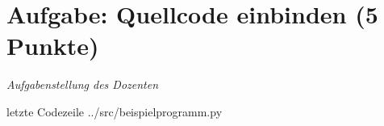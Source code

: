 
\newcommand{\dozent}{Prof. Dr. Claudia Müller-Birn, Barry Linnert}					%
\newcommand{\tutor}{Thierry Meurers}						%
\newcommand{\tutoriumNo}{10}				%
\newcommand{\ubungNo}{01}									%
\newcommand{\veranstaltung}{Objektorientierte Programmierung}	%
\newcommand{\semester}{SoSo 17}						%
\newcommand{\studenten}{Stefaan Hessmann, Jaap Pedersen, Mark Niehues}			%




\section{Aufgabe: Quellcode einbinden \hfill (5 Punkte)}
{\itshape Aufgabenstellung des Dozenten}

 letzte Codezeile
{../src/beispielprogramm.py}

